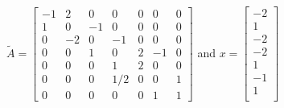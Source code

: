 \begin{example}
		\begin{center}
			$\tilde{A} = \begin{bmatrix}
				-1 & 2 & 0 & 0 & 0 & 0 & 0\\
				1 & 0 & -1 & 0 & 0 & 0 & 0\\
				0 & -2 & 0 & -1 & 0 & 0 & 0 \\
				0 & 0 & 1 & 0 &2 & -1 & 0\\
				0 & 0 & 0 & 1 & 2 & 0 & 0\\
				0 & 0 & 0 & 1/2&0 & 0 & 1\\
				0 & 0 & 0 & 0 &0 & 1 & 1
			\end{bmatrix}$
			and $x= \begin{bmatrix}
				-2\\
				1 \\
				-2\\
				-2\\
				1\\
				-1\\
				1\\
			\end{bmatrix}$
		\end{center}
		
	\end{example}